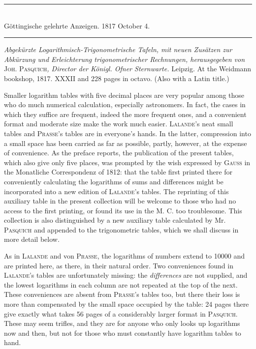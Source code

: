 \par{}
\begin{center}
\rule{0.65\linewidth}{0.4pt}\\
Göttingische gelehrte Anzeigen. 1817 October 4.\\
\rule{0.65\linewidth}{0.4pt}
\end{center}

\textit{Abgekürzte Logarithmisch-Trigonometrische Tafeln, mit neuen Zusätzen zur
Abkürzung und Erleichterung trigonometrischer Rechnungen, herausgegeben von }\textsc{Joh.}
\textsc{Pasquich}\textit{, Director der Königl. Ofner Sternwarte.} Leipzig. At the Weidmann bookshop, 1817. XXXII and 228 pages in octavo. (Also with a Latin title.)
\par{}
Smaller logarithm tables with five decimal places are very popular among those who do much numerical calculation, especially astronomers. In fact, the cases in which they suffice are frequent, indeed the more frequent ones, and a convenient format and moderate size make the work much easier. \textsc{Lalande}'s neat small tables and \textsc{Prasse}'s tables are in everyone's hands. In the latter, compression into a small space has been carried as far as possible, partly, however, at the expense of convenience. As the preface reports, the publication of the present tables, which also give only five places, was prompted by the wish expressed by \textsc{Gauss} in the Monatliche Correspondenz of 1812: that the table first printed there for conveniently calculating the logarithms of sums and differences might be incorporated into a new edition of \textsc{Lalande}'s tables. The reprinting of this auxiliary table in the present collection will be welcome to those who had no access to the first printing, or found its use in the M. C. too troublesome. This collection is also distinguished by a new auxiliary table calculated by Mr. \textsc{Pasquich} and appended to the trigonometric tables, which we shall discuss in more detail below.

As in \textsc{Lalande} and von \textsc{Prasse}, the logarithms of numbers extend to 10000 and are printed here, as there, in their natural order. Two conveniences found in \textsc{Lalande}'s tables are unfortunately missing: the \textit{differences} are not supplied, and the lowest logarithms in each column are not repeated at the top of the next. These conveniences are absent from \textsc{Prasse}'s tables too, but there their loss is more than compensated by the small space occupied by the table: 24 pages there give exactly what takes 56 pages of a considerably larger format in \textsc{Pasquich}. These may seem trifles, and they are for anyone who only looks up logarithms now and then, but not for those who must constantly have logarithm tables to hand.

